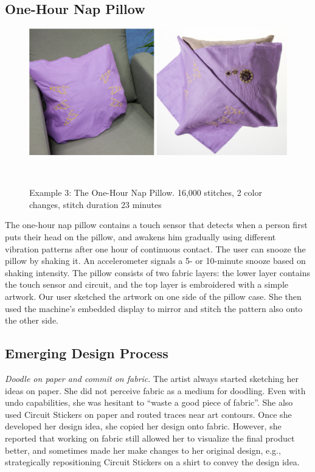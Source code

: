 \documentclass{sigchi}
\begin{document}
\subsection{One-Hour Nap Pillow}
\begin{figure} [h!]
\centering
  \includegraphics[width=1\columnwidth]{figures/Pillow}
  \caption{Example 3: The One-Hour Nap Pillow. 16,000 stitches, 2 color changes, stitch duration 23 minutes}~\label{fig:Pillow}
  \vspace{-0.5em}
\end{figure}
The one-hour nap pillow contains a touch sensor that detects when a person first puts their head on the pillow, and awakens him gradually using different vibration patterns after one hour of continuous contact. The user can snooze the pillow by shaking it. An accelerometer signals a 5- or 10-minute snooze based on shaking intensity. The pillow consists of two fabric layers: the lower layer contains the touch sensor and circuit, and the top layer is embroidered with a simple artwork. Our user sketched the artwork on one side of the pillow case. She then used the machine's embedded display to mirror and stitch the pattern also onto the other side. 


\subsection{Emerging Design Process}
\textit{Doodle on paper and commit on fabric}. The artist always started sketching her ideas on paper. She did not perceive fabric as a medium for doodling. Even with undo capabilities, she was hesitant to ``waste a good piece of fabric''. She also used Circuit Stickers on paper and routed traces near art contours. Once she developed her design idea, she copied her design onto fabric. However, she reported that working on fabric still allowed her to visualize the final product better, and sometimes made her make changes to her original design, e.g., strategically repositioning Circuit Stickers on a shirt to convey the design idea.
\end{document}
